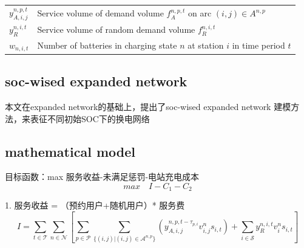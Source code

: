 \documentclass[12pt,hyperref,a4paper,UTF8]{ctexart}
\begin{document}
\begin{table}[!htbp]
\begin{tabular}{@{}lp{12cm}@{}}
    $y_{A,i,j}^{n,p,t}$ & Service volume of demand volume $f_{A}^{n,p,t}$ on arc $(i,j) \in A^{n,p}$ \\
    $y_{R}^{n,i,t}$ & Service volume of random demand volume $f_{R}^{n,i,t}$\\
    $w_{n,i,t}$ & Number of batteries in charging state $n$ at station $i$ in time period $t$ \\
    \bottomrule
  \end{tabular}
\end{table}


\subsection{soc-wised expanded network}
本文在expanded network的基础上，提出了soc-wised expanded network 建模方法，来表征不同初始SOC下的换电网络

\subsection{mathematical model}
目标函数：max 服务收益-未满足惩罚-电站充电成本
\begin{equation}
max \quad I-C_1-C_2
\end{equation}

1. 服务收益 = （预约用户+随机用户）* 服务费
\begin{equation}
I=\sum_{t \in \mathcal{T}}  \sum_{n \in \mathcal{N}} 
\left[  
\sum_{p \in \mathcal{P}} \sum_{\{(i,j) | (i,j) \in \mathcal{A}^{n,p}\}}  \left ( y^{n,p,t-\tau_{p,i}}_{A,i,j}v^{n}_{i,j}s_{i,t} \right )
+\sum_{i \in \mathcal{S}} y_{R}^{n,i,t}v^n_is_{i,t}
\right]
\end{equation}
\end{document}
